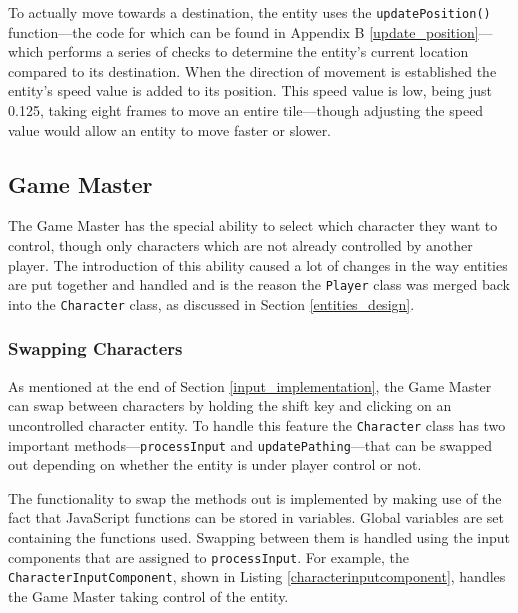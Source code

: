 To actually move towards a destination, the entity uses the \texttt{updatePosition()} function---the code for which can be found in Appendix B \ref{update_position}---which performs a series of checks to determine the entity's current location compared to its destination. When the direction of movement is established the entity's speed value is added to its position. This speed value is low, being just 0.125, taking eight frames to move an entire tile---though adjusting the speed value would allow an entity to move faster or slower.

\subsection{Game Master}
The Game Master has the special ability to select which character they want to control, though only characters which are not already controlled by another player. The introduction of this ability caused a lot of changes in the way entities are put together and handled and is the reason the \texttt{Player} class was merged back into the \texttt{Character} class, as discussed in Section \ref{entities_design}.

\subsubsection{Swapping Characters}
As mentioned at the end of Section \ref{input_implementation}, the Game Master can swap between characters by holding the shift key and clicking on an uncontrolled character entity. To handle this feature the \texttt{Character} class has two important methods---\texttt{processInput} and \texttt{updatePathing}---that can be swapped out depending on whether the entity is under player control or not.

The functionality to swap the methods out is implemented by making use of the fact that JavaScript functions can be stored in variables. Global variables are set containing the functions used. Swapping between them is handled using the input components that are assigned to \texttt{processInput}. For example, the \texttt{CharacterInputComponent}, shown in Listing \ref{characterinputcomponent}, handles the Game Master taking control of the entity.

